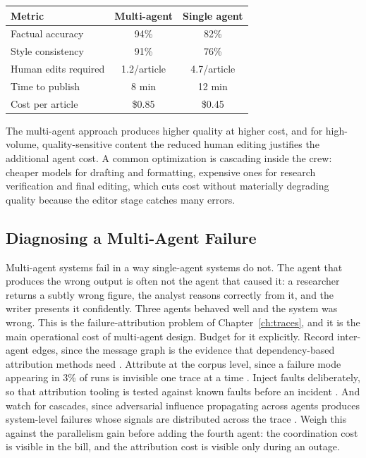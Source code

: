 \documentclass[11pt]{book}
\begin{document}
\begin{center}
\begin{tabular}{lcc}
\toprule
Metric & Multi-agent & Single agent \\
\midrule
Factual accuracy & 94\% & 82\% \\
Style consistency & 91\% & 76\% \\
Human edits required & 1.2/article & 4.7/article \\
Time to publish & 8 min & 12 min \\
Cost per article & \$0.85 & \$0.45 \\
\bottomrule
\end{tabular}
\end{center}

The multi-agent approach produces higher quality at higher cost, and for high-volume, quality-sensitive content the reduced human editing justifies the additional agent cost. A common optimization is cascading inside the crew: cheaper models for drafting and formatting, expensive ones for research verification and final editing, which cuts cost without materially degrading quality because the editor stage catches many errors.

\subsection{Diagnosing a Multi-Agent Failure}

Multi-agent systems fail in a way single-agent systems do not. The agent that produces the wrong output is often not the agent that caused it: a researcher returns a subtly wrong figure, the analyst reasons correctly from it, and the writer presents it confidently. Three agents behaved well and the system was wrong. This is the failure-attribution problem of Chapter~\ref{ch:traces}, and it is the main operational cost of multi-agent design. Budget for it explicitly. Record inter-agent edges, since the message graph is the evidence that dependency-based attribution methods need \cite{falat2026, influencegraph2026}. Attribute at the corpus level, since a failure mode appearing in 3\% of runs is invisible one trace at a time \cite{insights2026}. Inject faults deliberately, so that attribution tooling is tested against known faults before an incident \cite{otelmas2026}. And watch for cascades, since adversarial influence propagating across agents produces system-level failures whose signals are distributed across the trace \cite{caspian2026}. Weigh this against the parallelism gain before adding the fourth agent: the coordination cost is visible in the bill, and the attribution cost is visible only during an outage.
\end{document}
